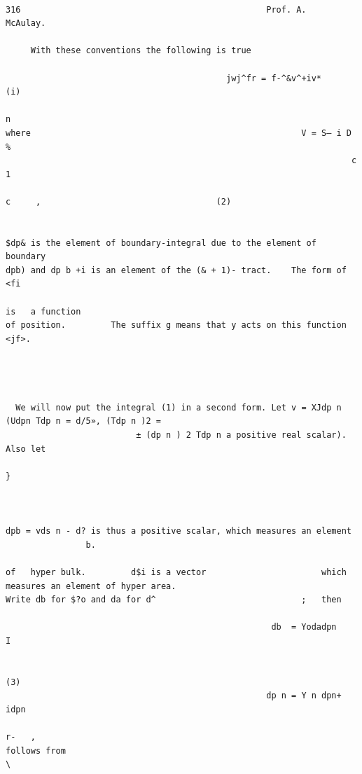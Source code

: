 \documentclass[10pt]{article}
\begin{document}
\begin{verbatim}

316                                                 Prof. A.              McAulay.

     With these conventions the following is true

                                            jwj^fr = f-^&v^+iv*                                                                 (i)
                                                                          n
where                                                      V = S— i D %
                                                                     c         1
                                                                                      c     ,                                   (2)


$dp& is the element of boundary-integral due to the element of boundary
dpb) and dp b +i is an element of the (& + 1)- tract.    The form of                                          <fi
                                                                                                                    is   a function
of position.         The suffix g means that y acts on this function                                       <jf>.




  We will now put the integral (1) in a second form. Let v = XJdp n
(Udpn Tdp n = d/5», (Tdp n )2 =
                          ± (dp n ) 2 Tdp n a positive real scalar). Also let
                                                                      }



dpb = vds n - d? is thus a positive scalar, which measures an element
                b.

of   hyper bulk.         d$i is a vector                       which measures an element of hyper area.
Write db for $?o and da for d^                             ;   then

                                                     db  = Yodadpn                                  I

                                                                                                                                (3)
                                                    dp n = Y n dpn+ idpn
                                                                         r-   ,
follows from                                                                                        \





\end{verbatim}
\end{document}
